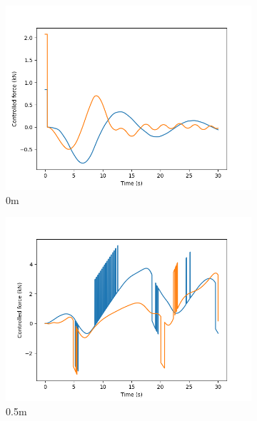 \documentclass[class=article, crop=false]{standalone}
\begin{document}
\begin{figure}
    \centering
    \begin{subfigure}[b]{0.48\textwidth}
        \centering
        \includegraphics{scenario1/rov-50m/0.0m/usv_forces}
        \caption{0m}
        \label{}
    \end{subfigure}
    \hfill
    \begin{subfigure}[b]{0.48\textwidth}
        \centering
        \includegraphics{scenario1/rov-50m/0.5m/usv_forces}
        \caption{0.5m}
        \label{}
    \end{subfigure}
    \vfill
    \begin{subfigure}[b]{0.48\textwidth}
        \centering

\end{subfigure}
\end{figure}
\end{document}
